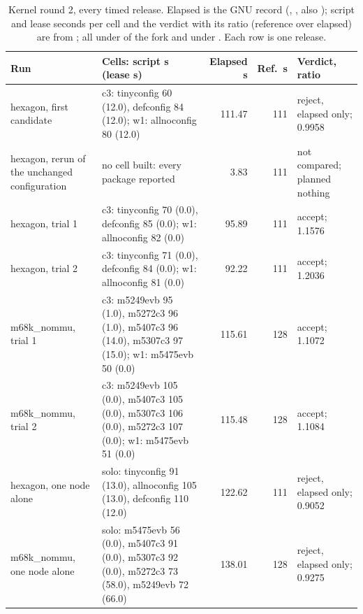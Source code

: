 \begin{table}[ht]
\centering\footnotesize
\caption{Kernel round 2, every timed release. Elapsed is the GNU 
record (\protect{}, \protect{}, also
\protect{}); script and lease seconds per cell and the
 verdict with its ratio (reference over elapsed) are from
\protect{}; all under \protect{} of
the fork and under
\protect{}.
Each row is one release.}
\label{tab:eval:kernel2}
\begin{tabular}{@{}L{2.4cm}L{4.9cm}rrL{3.3cm}@{}}
\toprule
Run & Cells: script s (lease s) & Elapsed s & Ref.\ s & Verdict, ratio \\
\midrule
hexagon, first candidate & c3: tinyconfig 60 (12.0), defconfig 84 (12.0);
w1: allnoconfig 80 (12.0) & 111.47 & 111 & reject, elapsed only; 0.9958 \\
hexagon, rerun of the unchanged configuration & no cell built: every package
reported  & 3.83 & 111 & not compared; planned nothing \\
hexagon, trial 1 & c3: tinyconfig 70 (0.0), defconfig 85 (0.0); w1: allnoconfig
82 (0.0) & 95.89 & 111 & accept; 1.1576 \\
hexagon, trial 2 & c3: tinyconfig 71 (0.0), defconfig 84 (0.0); w1: allnoconfig
81 (0.0) & 92.22 & 111 & accept; 1.2036 \\
m68k\_nommu, trial 1 & c3: m5249evb 95 (1.0), m5272c3 96 (1.0), m5407c3 96
(14.0), m5307c3 97 (15.0); w1: m5475evb 50 (0.0) & 115.61 & 128 & accept;
1.1072 \\
m68k\_nommu, trial 2 & c3: m5249evb 105 (0.0), m5407c3 105 (0.0), m5307c3 106
(0.0), m5272c3 107 (0.0); w1: m5475evb 51 (0.0) & 115.48 & 128 & accept;
1.1084 \\
hexagon, one node alone & solo: tinyconfig 91 (13.0), allnoconfig 105 (13.0),
defconfig 110 (12.0) & 122.62 & 111 & reject, elapsed only; 0.9052 \\
m68k\_nommu, one node alone & solo: m5475evb 56 (0.0), m5407c3 91 (0.0),
m5307c3 92 (0.0), m5272c3 73 (58.0), m5249evb 72 (66.0) & 138.01 & 128 &
reject, elapsed only; 0.9275 \\
\bottomrule
\end{tabular}
\end{table}

